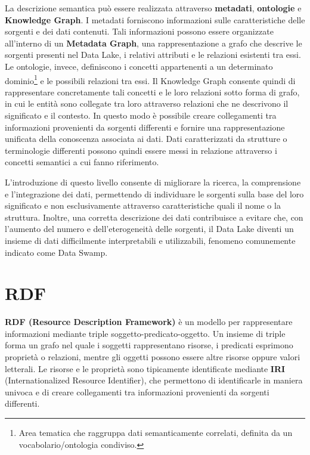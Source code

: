 \documentclass[13.6pt,a4paper]{report}
\begin{document}
\noindent
La descrizione semantica può essere realizzata attraverso \textbf{metadati}, \textbf{ontologie} e \textbf{Knowledge Graph}. I metadati forniscono informazioni sulle caratteristiche delle sorgenti e dei dati contenuti. Tali informazioni possono essere organizzate all'interno di un \textbf{Metadata Graph}, una rappresentazione a grafo che descrive le sorgenti presenti nel Data Lake, i relativi attributi e le relazioni esistenti tra essi. Le ontologie, invece, definiscono i concetti appartenenti a un determinato dominio\footnote{Area tematica che raggruppa dati semanticamente correlati, definita da un vocabolario/ontologia condiviso.} e le possibili relazioni tra essi. Il Knowledge Graph consente quindi di rappresentare concretamente tali concetti e le loro relazioni sotto forma di grafo, in cui le entità sono collegate tra loro attraverso relazioni che ne descrivono il significato e il contesto. In questo modo è possibile creare collegamenti tra informazioni provenienti da sorgenti differenti e fornire una rappresentazione unificata della conoscenza associata ai dati. Dati caratterizzati da strutture o terminologie differenti possono quindi essere messi in relazione attraverso i concetti semantici a cui fanno riferimento.

\noindent
L'introduzione di questo livello consente di migliorare la ricerca, la comprensione e l'integrazione dei dati, permettendo di individuare le sorgenti sulla base del loro significato e non esclusivamente attraverso caratteristiche quali il nome o la struttura. Inoltre, una corretta descrizione dei dati contribuisce a evitare che, con l'aumento del numero e dell'eterogeneità delle sorgenti, il Data Lake diventi un insieme di dati difficilmente interpretabili e utilizzabili, fenomeno comunemente indicato come Data Swamp.



\section{RDF}
\textbf{RDF (Resource Description Framework)} è un modello per rappresentare informazioni mediante triple soggetto-predicato-oggetto. Un insieme di triple forma un grafo nel quale i soggetti rappresentano risorse, i predicati esprimono proprietà o relazioni, mentre gli oggetti possono essere altre risorse oppure valori letterali. Le risorse e le proprietà sono tipicamente identificate mediante \textbf{IRI} (Internationalized Resource Identifier), che permettono di identificarle in maniera univoca e di creare collegamenti tra informazioni provenienti da sorgenti differenti.
\end{document}

